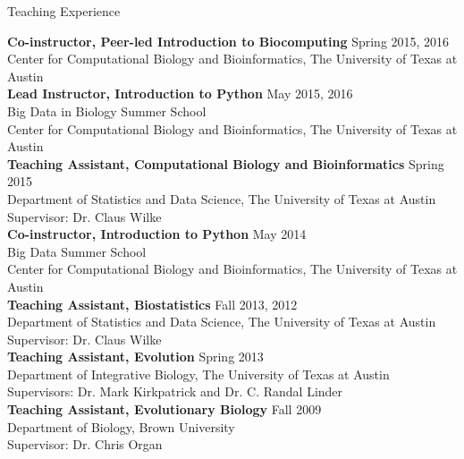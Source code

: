 \documentclass{resume} %
\begin{document}
\vspace*{0.5cm}
\begin{rSection}{Teaching Experience}
\vspace*{0.25cm}


\textbf{Co-instructor, Peer-led Introduction to Biocomputing} \hfill Spring 2015, 2016 \\ Center for Computational Biology and Bioinformatics, The University of Texas at Austin \\

\textbf{Lead Instructor, Introduction to Python} \hfill May 2015, 2016 \\ Big Data in Biology Summer School \\ Center for Computational Biology and Bioinformatics, The University of Texas at Austin \\

\textbf{Teaching Assistant, Computational Biology and Bioinformatics} \hfill Spring 2015 \\ Department of Statistics and Data Science, The University of Texas at Austin \\
Supervisor: Dr. Claus Wilke \\

\textbf{Co-instructor, Introduction to Python} \hfill May 2014 \\ Big Data Summer School \\ Center for Computational Biology and Bioinformatics, The University of Texas at Austin \\


\textbf{Teaching Assistant, Biostatistics} \hfill Fall 2013, 2012 \\ Department of Statistics and Data Science, The University of Texas at Austin \\
Supervisor: Dr. Claus Wilke \\

\textbf{Teaching Assistant, Evolution} \hfill Spring 2013 \\ Department of Integrative Biology, The University of Texas at Austin \\
Supervisors: Dr. Mark Kirkpatrick and Dr. C. Randal Linder \\

\textbf{Teaching Assistant, Evolutionary Biology} \hfill Fall 2009  \\ Department of Biology, Brown University \\
Supervisor: Dr. Chris Organ

\end{rSection}
\vspace*{0.5cm}
\end{document}
